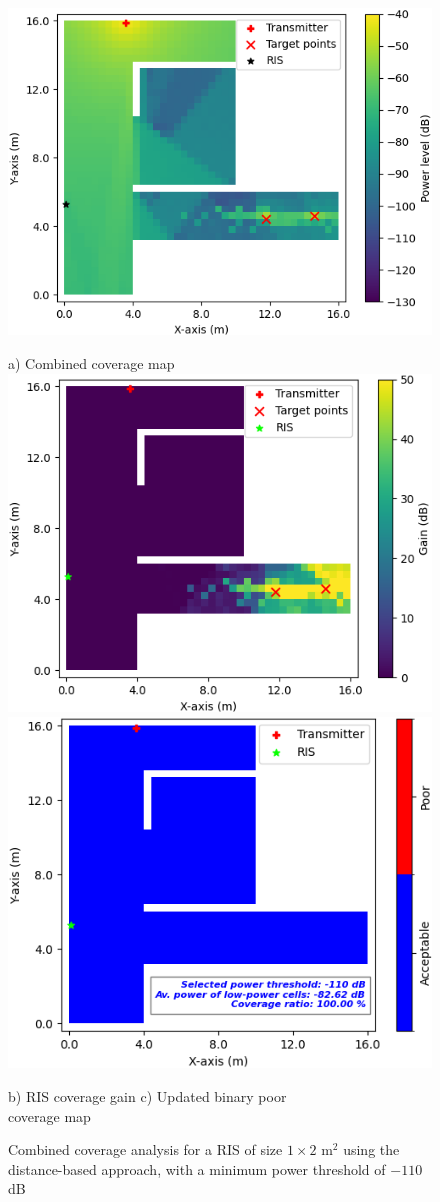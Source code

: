 \documentclass{IEEEoj}
\begin{document}
\begin{figure}
	\centering
	\includegraphics[width=0.7\linewidth]{Sim_Results/Comb_cov_1x2_Distance_-110dB.png}
	
	a) Combined coverage map \\[5pt]
	
	\includegraphics[width=0.49\linewidth]{Sim_Results/RIS_cov_gain_1x2_Distance_-110dB.png}
	\hfill
	\includegraphics[width=0.48\linewidth]{Sim_Results/New_Binary_Cov_Map_1x2_Distance_-110dB.png}
	
	\hspace{10pt} b) RIS coverage gain \hspace{30pt} c) Updated binary poor \\ \hspace{140pt} coverage map
	\caption{Combined coverage analysis for a RIS of size $1 \times 2$ m$^2$ using the distance-based approach, with a minimum power threshold of $-110$ dB}
	\label{comb_cov_distance_-110dB}
\end{figure}
\end{document}
